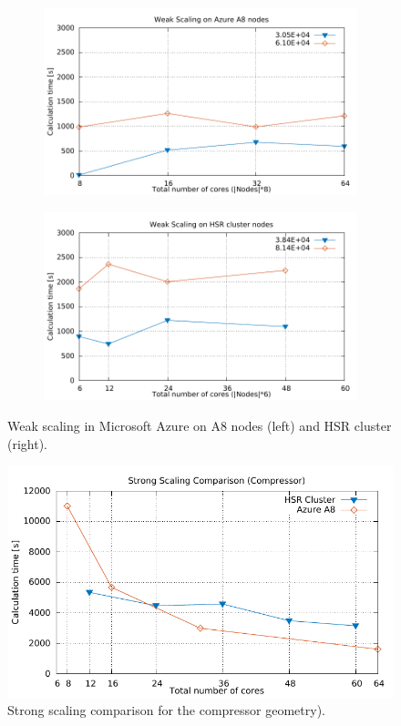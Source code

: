 \documentclass[3p,times]{elsarticle}
\begin{document}
\begin{figure}
\centering
\begin{subfigure}{.4\textwidth}
	\centering
	\includegraphics[width=\linewidth]{gplt-a8-weak-pipe}	
	\label{fig:weakA8}
\end{subfigure}
\begin{subfigure}{.4\textwidth}
	\centering
	\includegraphics[width=\linewidth]{gplt-hsr-weak-pipe}
	\label{fig:weakHSR}
\end{subfigure}

\caption{Weak scaling in Microsoft Azure on A8 nodes (left) and HSR cluster (right). }
\label{fig:weakPipe}
\end{figure}

\begin{figure}
	\centering
	\includegraphics[width=0.5\linewidth]{gplt-compressor}
	\caption{Strong scaling comparison for the compressor geometry). }
	\label{fig:compressor}
\end{figure}
\end{document}
